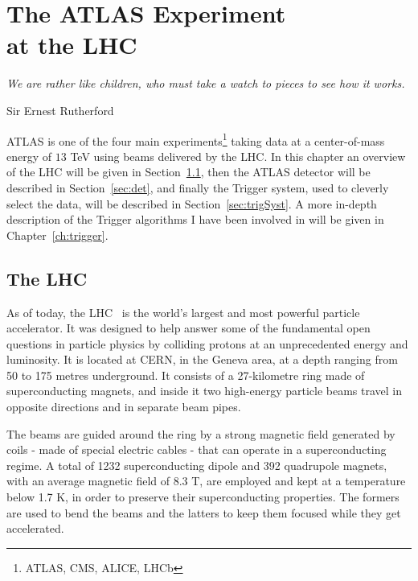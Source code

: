 \chapter[The ATLAS Experiment at the LHC]{The ATLAS Experiment \protect\\at the LHC}
\label{ch:detector}
\epigraph{\emph{We are rather like children, who must take a watch to pieces to see how it works.}}{Sir Ernest Rutherford}

	\ac{ATLAS} is one of the four main experiments\footnote{\ac{ATLAS}, \ac{CMS}, \ac{ALICE}, \ac{LHCb}} taking data at a center-of-mass energy of $13$ TeV using beams delivered by the \ac{LHC}. In this chapter an overview of the \ac{LHC} will be given in Section~\ref{sec:lhc}, then the \ac{ATLAS} detector will be described in Section~\ref{sec:det}, and finally the Trigger system, used to cleverly select the data, will be described in Section~\ref{sec:trigSyst}. A more in-depth description of the Trigger algorithms I have been involved in will be given in Chapter~\ref{ch:trigger}.



	\section{The LHC}
	\label{sec:lhc}
	
		As of today, the \ac{LHC}~\cite{LHCDesignReport} is the world’s largest and most powerful particle accelerator. It was designed to help answer some of the fundamental open questions in particle physics by colliding protons at an unprecedented energy and luminosity. It is located at \ac{CERN}, in the Geneva area, at a depth ranging from 50 to 175 metres underground. It consists of a 27-kilometre ring made of superconducting magnets, and inside it two high-energy particle beams travel in opposite directions and in separate beam pipes. 

		The beams are guided around the ring by a strong magnetic field generated by coils - made of special electric cables - that can operate in a superconducting regime. A total of 1232 superconducting dipole and 392 quadrupole magnets, with an average magnetic field of 8.3 T, are employed and kept at a temperature below 1.7 K, in order to preserve their superconducting properties. The formers are used to bend the beams and the latters to keep them focused while they get accelerated. 
		
